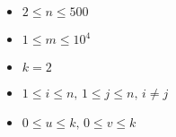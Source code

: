 \begin{itemize}
\tightlist
\item $2 \le n \le 500$
\item $1 \le m \le 10^4$
\item $k = 2$
\item $1 \le i \le n ,\,1\le j \le n ,\, i \ne j$
\item $0 \le u \le k ,\,0\le v \le k$
\end{itemize}
